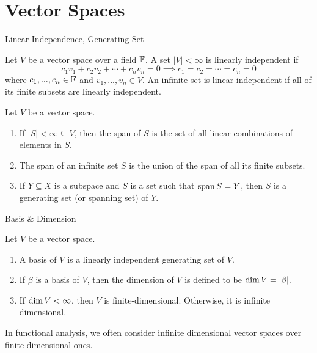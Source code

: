 \documentclass[10pt]{beamer}
\begin{document}
    \section{Vector Spaces}
    \begin{frame}{Linear Independence, Generating Set}
        \begin{definition}
            Let $V$ be a vector space over a field $\mathbb{F}$. A set $|V| < \infty$ is \alert{linearly independent} if 
            \begin{equation*}
                c_1v_1 + c_2v_2 + \cdots + c_nv_n = 0 \implies c_1 = c_2 = \cdots = c_n = 0
            \end{equation*}
            where $c_1, ..., c_n\in\mathbb{F}$ and $v_1, ..., v_n\in V$. An infinite set is linear independent if all of its finite subsets are linearly independent.
        \end{definition}

        \begin{definition}
            Let $V$ be a vector space. 
            \begin{enumerate}
                \item If $|S| < \infty \subseteq V$, then the \alert{span} of $S$ is the set of all linear combinations of elements in $S$. 
                \item The span of an infinite set $S$ is the union of the span of all its finite subsets. 
                \item If $Y \subseteq X$ is a subspace and $S$ is a set such that $\operatorname{span} S = Y$, then $S$ is a \alert{generating set} (or \alert{spanning set}) of $Y$. 
            \end{enumerate}
        \end{definition}
    \end{frame}

    \begin{frame}{Basis \& Dimension}
        \begin{definition}
            Let $V$ be a vector space. 
            \begin{enumerate}
                \item A \alert{basis} of $V$ is a linearly independent generating set of $V$. 
                \item If $\beta$ is a basis of $V$, then the \alert{dimension} of $V$ is defined to be $\operatorname{dim} V = |\beta|$. 
                \item If $\operatorname{dim} V < \infty$, then $V$ is \alert{finite-dimensional}. Otherwise, it is \alert{infinite dimensional}.
            \end{enumerate}
        \end{definition}
        In functional analysis, we often consider infinite dimensional vector spaces over finite dimensional ones.
    \end{frame}
\end{document}

